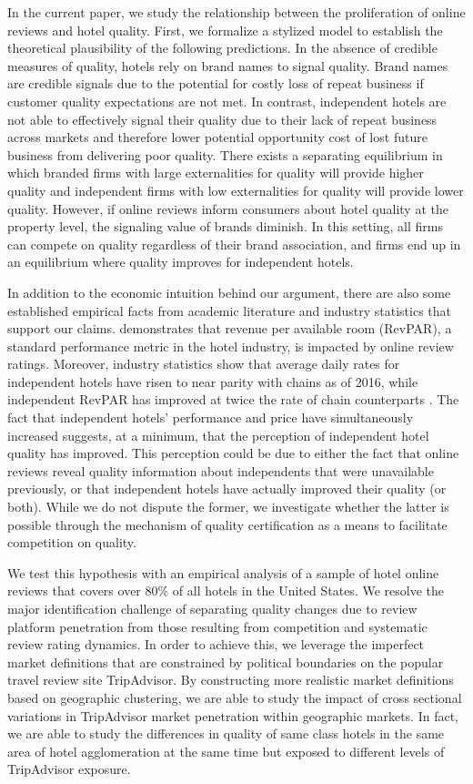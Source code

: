 \documentclass[mksc,blindrev]{informs3} %
\begin{document}
In the current paper, we study the relationship between the proliferation of online reviews and hotel quality. First, we formalize a stylized model to establish the theoretical plausibility of the following predictions. In the absence of credible measures of quality, hotels rely on brand names to signal quality. Brand names are credible signals due to the potential for costly loss of repeat business if customer quality expectations are not met. In contrast, independent hotels are not able to effectively signal their quality due to their lack of repeat business across markets and therefore lower potential opportunity cost of lost future business from delivering poor quality. There exists a separating equilibrium in which branded firms with large externalities for quality will provide higher quality and independent firms with low externalities for quality will provide lower quality. However, if online reviews inform consumers about hotel quality at the property level, the signaling value of brands diminish. In this setting, all firms can compete on quality regardless of their brand association, and firms end up in an equilibrium where quality improves for independent hotels. 

In addition to the economic intuition behind our argument, there are also some established empirical facts from academic literature and industry statistics that support our claims.  demonstrates that revenue per available room (RevPAR), a standard performance metric in the hotel industry, is impacted by online review ratings. Moreover, industry statistics show that average daily rates for independent hotels have risen to near parity with chains as of 2016, while independent RevPAR has improved at twice the rate of chain counterparts \citep{lodging2017}. The fact that independent hotels' performance and price have simultaneously increased suggests, at a minimum, that the perception of independent hotel quality has improved. This perception could be due to either the fact that online reviews reveal quality information about independents that were unavailable previously, or that independent hotels have actually improved their quality (or both). While we do not dispute the former, we investigate whether the latter is possible through the mechanism of quality certification as a means to facilitate competition on quality.

We test this hypothesis with an empirical analysis of a sample of hotel online reviews that covers over 80\% of all hotels in the United States. We resolve the major identification challenge of separating quality changes due to review platform penetration from those resulting from competition and systematic review rating dynamics. In order to achieve this, we leverage the imperfect market definitions that are constrained by political boundaries on the popular travel review site TripAdvisor. By constructing more realistic market definitions based on geographic clustering, we are able to study the impact of cross sectional variations in TripAdvisor market penetration within geographic markets. In fact, we are able to study the differences in quality of same class hotels in the same area of hotel agglomeration at the same time but exposed to different levels of TripAdvisor exposure. %
\end{document}

